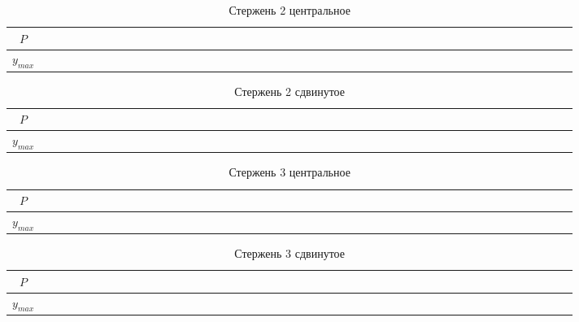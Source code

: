 \documentclass[a4paper,12pt]{article} %
\begin{document}
\begin{table}[!ht]
    \centering
    \begin{tabular}{|c|c|c|c|c|c|c|c|c|c|c}
        \hline
    $ P $   & ~~~~~~~~ & ~~~~~~~~ & ~~~~~~~~ & ~~~~~~~~ & ~~~~~~~~ & ~~~~~~~~ & ~~~~~~~~ &  ~~~~~~~~ \\ \hline
    $y_{max}$ & ~~~~~~~~ & ~~~~~~~~ & ~~~~~~~~ & ~~~~~~~~ & ~~~~~~~~ & ~~~~~~~~ & ~~~~~~~~ &  ~~~~~~~~\\ \hline
    \end{tabular}
    \caption{Стержень 2 центральное}
\end{table}
\begin{table}[!ht]
    \centering
    \begin{tabular}{|c|c|c|c|c|c|c|c|c|c|c}
        \hline
    $ P $   & ~~~~~~~~ & ~~~~~~~~ & ~~~~~~~~ & ~~~~~~~~ & ~~~~~~~~ & ~~~~~~~~ & ~~~~~~~~ &  ~~~~~~~~ \\ \hline
    $y_{max}$ & ~~~~~~~~ & ~~~~~~~~ & ~~~~~~~~ & ~~~~~~~~ & ~~~~~~~~ & ~~~~~~~~ & ~~~~~~~~ &  ~~~~~~~~\\ \hline
    \end{tabular}
    \caption{Стержень 2 сдвинутое}
\end{table}
\begin{table}[!ht]
    \centering
    \begin{tabular}{|c|c|c|c|c|c|c|c|c|c|c}
        \hline
    $ P $   & ~~~~~~~~ & ~~~~~~~~ & ~~~~~~~~ & ~~~~~~~~ & ~~~~~~~~ & ~~~~~~~~ & ~~~~~~~~ &  ~~~~~~~~ \\ \hline
    $y_{max}$ & ~~~~~~~~ & ~~~~~~~~ & ~~~~~~~~ & ~~~~~~~~ & ~~~~~~~~ & ~~~~~~~~ & ~~~~~~~~ &  ~~~~~~~~\\ \hline
    \end{tabular}
    \caption{Стержень 3 центральное}
\end{table}
\begin{table}[!ht]
    \centering
    \begin{tabular}{|c|c|c|c|c|c|c|c|c|c|c}
        \hline
    $ P $   & ~~~~~~~~ & ~~~~~~~~ & ~~~~~~~~ & ~~~~~~~~ & ~~~~~~~~ & ~~~~~~~~ & ~~~~~~~~ &  ~~~~~~~~ \\ \hline
    $y_{max}$ & ~~~~~~~~ & ~~~~~~~~ & ~~~~~~~~ & ~~~~~~~~ & ~~~~~~~~ & ~~~~~~~~ & ~~~~~~~~ &  ~~~~~~~~\\ \hline
    \end{tabular}
    \caption{Стержень 3 сдвинутое}
\end{table}
\end{document}
